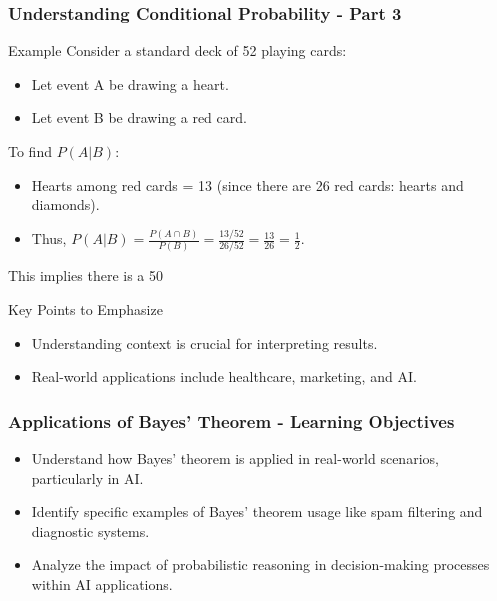 \documentclass[aspectratio=169]{beamer}
\begin{document}
\begin{frame}[fragile]
    \frametitle{Understanding Conditional Probability - Part 3}
    \begin{block}{Example}
        Consider a standard deck of 52 playing cards:
        \begin{itemize}
            \item Let event A be drawing a heart.
            \item Let event B be drawing a red card.
        \end{itemize}

        To find \( P(A | B) \):
        \begin{itemize}
            \item Hearts among red cards = 13 (since there are 26 red cards: hearts and diamonds).
            \item Thus, \( P(A | B) = \frac{P(A \cap B)}{P(B)} = \frac{13/52}{26/52} = \frac{13}{26} = \frac{1}{2} \).
        \end{itemize}
        This implies there is a 50%
    \end{block}

    \begin{block}{Key Points to Emphasize}
        \begin{itemize}
            \item Understanding context is crucial for interpreting results.
            \item Real-world applications include healthcare, marketing, and AI.
        \end{itemize}
    \end{block}
\end{frame}

\begin{frame}[fragile]
    \frametitle{Applications of Bayes' Theorem - Learning Objectives}
    \begin{itemize}
        \item Understand how Bayes' theorem is applied in real-world scenarios, particularly in AI.
        \item Identify specific examples of Bayes' theorem usage like spam filtering and diagnostic systems.
        \item Analyze the impact of probabilistic reasoning in decision-making processes within AI applications.
    \end{itemize}
\end{frame}
\end{document}
